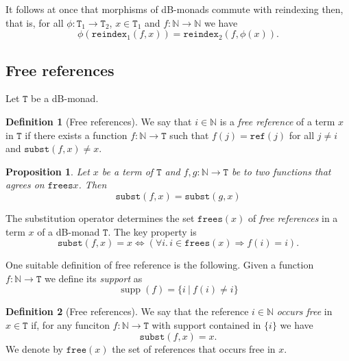 \documentclass[a4paper,twoside,12pt,draft]{article}
\newtheorem{proposition}{Proposition}
\theoremstyle{definition}
\newtheorem{definition}{Definition}
\theoremstyle{remark}
\DeclareMathOperator{\supp}{supp}
\newcommand{\NN}{\mathbb{N}}
\newcommand{\TT}{\mathtt{T}}
\newcommand{\subst}{\mathtt{subst}}
\newcommand{\refe}{\mathtt{ref}}
\newcommand{\frees}{\mathtt{frees}}
\newcommand{\reindex}{\mathtt{reindex}}
\begin{document}
It follows at once that morphisms of dB-monads commute with reindexing
then, that is, for all $\phi\colon \TT_1 \to \TT_2$, $x\in \TT_1$ and
$f\colon \NN\to \NN$ we have
\begin{equation}
  \phi(\reindex_1(f,x)) = \reindex_2(f,\phi(x)) .
\end{equation}

\subsection{Free references}
\label{sec:free-references}

Let $\TT$ be a dB-monad.

\begin{definition}[Free references]
  We say that $i \in \NN$ is a \emph{free reference} of a term $x$ in
  $\TT$ if there exists a function $f\colon \NN \to \TT$ such that
  $f(j) = \refe(j)$ for all $j\neq i$ and $\subst(f,x) \neq x$.
\end{definition}

\begin{proposition}
  Let $x$ be a term of $\TT$ and $f,g:\NN\longrightarrow \TT$ be to
  two functions that agrees on $\frees{x}$.  Then
  \begin{equation*}
    \subst(f,x) = \subst(g,x)
  \end{equation*}
\end{proposition}

  The substitution operator determines the set
$\frees(x)$ of \emph{free references} in a term $x$ of a dB-monad
$\TT$.  The key property is
\begin{equation*}
  \subst(f,x) = x \Longleftrightarrow
  (\forall i.\, i \in \mathtt{frees}(x) \Longrightarrow f(i) = i).
\end{equation*}

One suitable definition of free reference is the following.  Given a
function $f: \NN \longrightarrow \TT$ we define its \emph{support} as
\begin{equation}
  \label{eq:support}
  \supp(f) = \big\{i\ \big|\ f(i)\neq i\big\}
\end{equation}

\begin{definition}[Free references]
  We say that the reference $i\in\NN$ \emph{occurs free} in $x\in\TT$
  if, for any funciton $f\colon\NN\longrightarrow \TT$ with support
  contained in $\{i\}$ we have
  \begin{equation*}
    \subst(f,x) = x.
  \end{equation*}
  We denote by $\mathtt{free}(x)$ the set of references that occurs
  free in $x$.
\end{definition}
\end{document}
